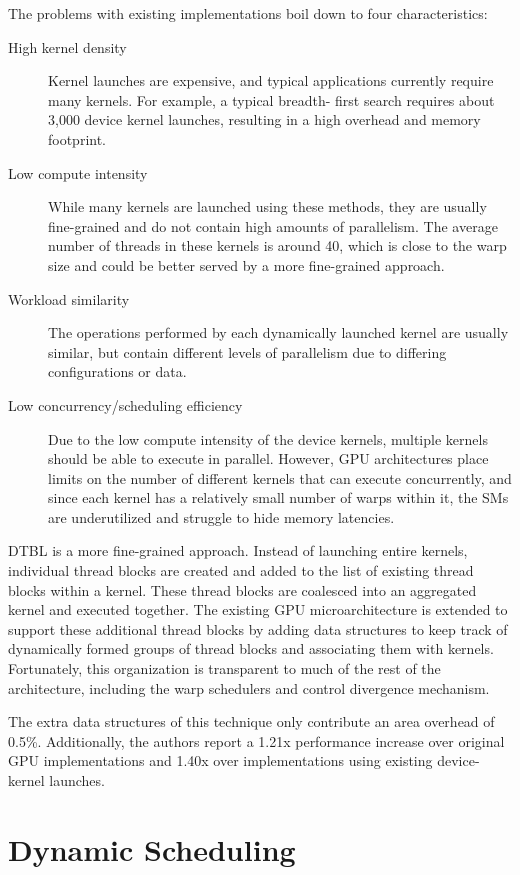 \documentclass[prodmode,acmtecs]{acmsmall} %
\begin{document}
The problems with existing implementations boil down to four characteristics:
\begin{description}
\item [High kernel density] Kernel launches are expensive, and typical
applications currently require many kernels. For example, a typical breadth-
first search requires about 3,000 device kernel launches, resulting in a high
overhead and memory footprint.
\item [Low compute intensity] While many kernels are launched using these
methods, they are usually fine-grained and do not contain high amounts of
parallelism. The average number of threads in these kernels is around 40, which
is close to the warp size and could be better served by a more fine-grained
approach.
\item [Workload similarity] The operations performed by each dynamically
launched kernel are usually similar, but contain different levels of parallelism
due to differing configurations or data.
\item [Low concurrency/scheduling efficiency] Due to the low compute intensity
of the device kernels, multiple kernels should be able to execute in parallel.
However, GPU architectures place limits on the number of different kernels that
can execute concurrently, and since each kernel has a relatively small number of
warps within it, the SMs are underutilized and struggle to hide memory
latencies.
\end{description}

DTBL is a more fine-grained approach. Instead of launching entire kernels,
individual thread blocks are created and added to the list of existing thread
blocks within a kernel. These thread blocks are coalesced into an aggregated
kernel and executed together. The existing GPU microarchitecture is extended to
support these additional thread blocks by adding data structures to keep track
of dynamically formed groups of thread blocks and associating them with kernels.
Fortunately, this organization is transparent to much of the rest of the
architecture, including the warp schedulers and control divergence mechanism.

The extra data structures of this technique only contribute an area overhead of
0.5\%. Additionally, the authors report a 1.21x performance increase over
original GPU implementations and 1.40x over implementations using existing
device-kernel launches.

\section{Dynamic Scheduling} \label{sec:scheduling}
\end{document}
